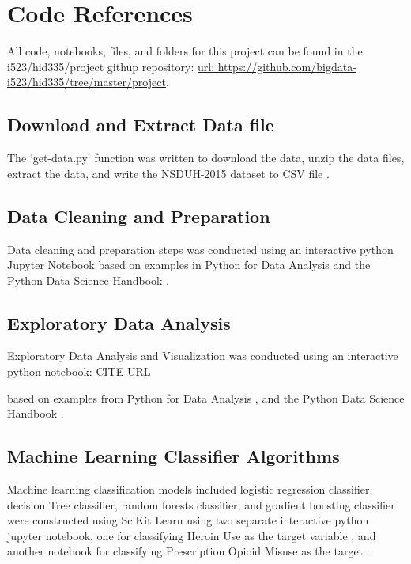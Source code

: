 \documentclass[sigconf]{acmart}
\begin{document}

 


\appendix

\section{Code References}
All code, notebooks, files, and folders for this project can be found in the
i523/hid335/project githup repository: 
\url{url:  https://github.com/bigdata-i523/hid335/tree/master/project}.

\subsection{Download and Extract Data file}

The `get-data.py` function was written to download the data, unzip the data
files, extract the data, and write the NSDUH-2015 dataset to CSV file 
\cite{getdata17}.

\subsection{Data Cleaning and Preparation}

Data cleaning and preparation steps was conducted using an interactive python Jupyter Notebook \cite{data17} based on examples in Python for Data Analysis \cite{mckinney17} and the Python Data Science Handbook \cite{vanderplas17}.

\subsection{Exploratory Data Analysis}

Exploratory Data Analysis and Visualization was conducted using an interactive
python notebook: CITE URL

based on examples from Python for Data Analysis \cite{mckinney17}, and the 
Python Data Science Handbook \cite{vanderplas17}.  

\subsection{Machine Learning Classifier Algorithms}
Machine learning classification models included logistic regression classifier, 
decision Tree classifier, random forests classifier, and gradient boosting 
classifier were constructed using SciKit Learn \cite{muller17, raschka17} 
using two separate interactive python jupyter notebook, one for classifying 
Heroin Use as the target variable \cite{classifyH}, and another notebook for classifying Prescription Opioid Misuse as the target \cite{classifyPRL}. 





%
\end{document}

